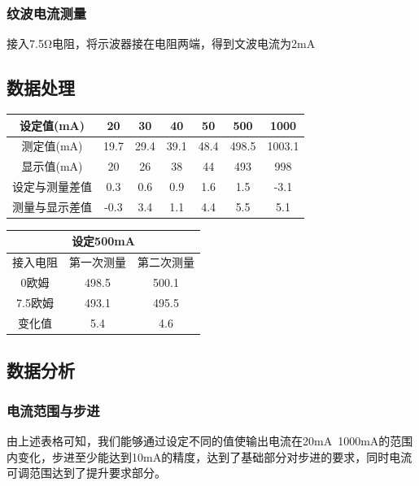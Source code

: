 \documentclass{zjureport}
\begin{document}
            \subsubsection{纹波电流测量}
            接入7.5Ω电阻，将示波器接在电阻两端，得到文波电流为2mA
        \subsection{数据处理}
        \begin{table}[htp]
            \centering
            \begin{tabular}{|c|c|c|c|c|c|c|}
            \hline
            设定值(mA) & 20   & 30   & 40   & 50   & 500   & 1000   \\ \hline
            测定值(mA) & 19.7 & 29.4 & 39.1 & 48.4 & 498.5 & 1003.1 \\ \hline
            显示值(mA) & 20   & 26   & 38   & 44   & 493   & 998    \\ \hline
            设定与测量差值 & 0.3  & 0.6  & 0.9  & 1.6  & 1.5   & -3.1   \\ \hline
            测量与显示差值 & -0.3 & 3.4  & 1.1  & 4.4  & 5.5   & 5.1    \\ \hline
            \end{tabular}
            \end{table}

            \begin{table}[htp]
                \centering
                \begin{tabular}{|c|c|c|}
                \hline
                \multicolumn{3}{|c|}{设定500mA} \\ \hline
                接入电阻     & 第一次测量    & 第二次测量   \\ \hline
                0欧姆      & 498.5    & 500.1   \\ \hline
                7.5欧姆    & 493.1    & 495.5   \\ \hline
                变化值      & 5.4      & 4.6     \\ \hline
                \end{tabular}
                \end{table}
                \newpage
        \subsection{数据分析}
            \subsubsection{电流范围与步进}
            由上述表格可知，我们能够通过设定不同的值使输出电流在20mA~1000mA的范围内变化，步进至少能达到10mA的精度，达到了基础部分对步进的要求，同时电流可调范围达到了提升要求部分。
\end{document}

